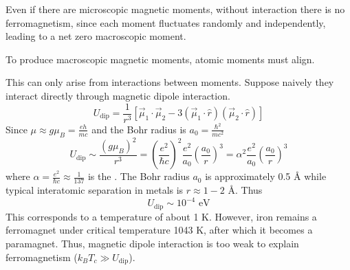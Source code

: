 \documentclass[12pt,a4paper,titlepage]{article}
\newcommand{\trm}[1]{\textrm{#1}} %
\newcommand{\ul}[1]{\underline{\smash{#1}}} %
\newcommand{\angstrom}{\textup{\AA}} %
\begin{document}
Even if there are microscopic magnetic moments, without interaction there is no ferromagnetism, since each moment fluctuates randomly and independently, leading to a net zero macroscopic moment.
\begin{center}
\end{center}
To produce macroscopic magnetic moments, atomic moments must align.
\begin{center}
\end{center}
This can only arise from interactions between moments. Suppose naively they interact directly through magnetic dipole interaction.
\begin{equation}
U_{\trm{dip}}=\frac{1}{r^{3}}\left[\vec{\mu}_{1}\cdot\vec{\mu}_{2}-3(\vec{\mu}_{1}\cdot\hat{r})(\vec{\mu}_{2}\cdot\hat{r})\right]
\end{equation}
Since $\mu\approx g\mu_{B}=\frac{eh}{mc}$ and the Bohr radius is $a_{0}=\frac{\hbar^{2}}{mc^{2}}$
\begin{equation}
U_{\trm{dip}}\sim\frac{(g\mu_{B})^{2}}{r^{3}}=\left(\frac{e^{2}}{\hbar c}\right)^{2}\frac{e^{2}}{a_{0}}\left(\frac{a_{0}}{r}\right)^{3}=\alpha^{2}\frac{e^{2}}{a_{0}}\left(\frac{a_{0}}{r}\right)^{3}
\end{equation}
where $\alpha=\frac{e^{2}}{\hbar c}\approx\frac{1}{137}$ is the \ul{fine structure constant}. The Bohr radius $a_{0}$ is approximately 0.5 \angstrom{} while typical interatomic separation in metals is $r\approx 1-2$ \angstrom{}. Thus
\begin{equation}
U_{\trm{dip}}\sim10^{-4}\trm{ eV}
\end{equation}
This corresponds to a temperature of about 1 K. However, iron remains a ferromagnet under critical temperature 1043 K, after which it becomes a paramagnet. Thus, magnetic dipole interaction is too weak to explain ferromagnetism ($k_{B}T_{c}\gg U_{\trm{dip}}$).\\
\end{document}
